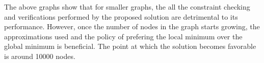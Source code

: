 The above graphs show that for smaller graphs, the all the constraint checking and verifications performed 
by the proposed solution are detrimental to its performance. However, once the number of nodes in the graph starts 
growing, the approximations used and the policy of prefering the local minimum over the global minimum is beneficial.
The point at which the solution becomes favorable is around 10000 nodes.
